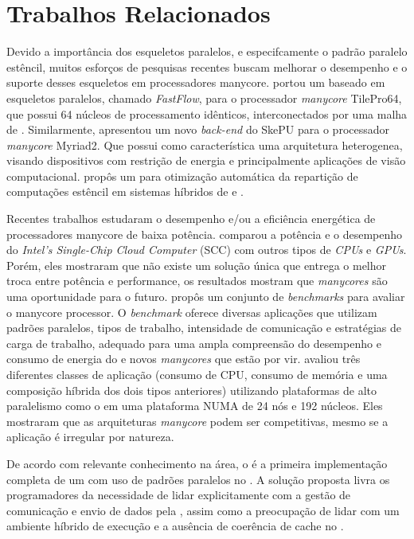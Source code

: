 %
\chapter{Trabalhos Relacionados}

Devido a importância dos esqueletos paralelos, e especifcamente o padrão paralelo estêncil, muitos esforços de pesquisas recentes buscam melhorar o desempenho e o suporte desses esqueletos em processadores manycore. \cite{buono13} portou um \fw baseado em esqueletos paralelos, chamado \textit{FastFlow}, para o processador \textit{manycore} TilePro64, que possui 64 núcleos de processamento idênticos, interconectados por uma malha de \noc. Similarmente, \cite{thoraransen16} apresentou um novo \textit{back-end} do \fw SkePU para o processador \textit{manycore} Myriad2. Que possui como característica uma arquitetura heterogenea, visando dispositivos com restrição de energia e principalmente aplicações de visão computacional. \cite{gysi15} propôs um \fw para otimização automática da repartição de computações estêncil em sistemas híbridos de \cpu e \gpu.

Recentes trabalhos estudaram o desempenho e/ou a eficiência energética de processadores manycore de baixa potência. \cite{SCCEnergy:2012}  comparou a potência e o desempenho do \textit{Intel's Single-Chip Cloud Computer} (SCC) com outros tipos de \textit{CPUs} e \textit{GPUs}. Porém, eles mostraram que não existe um solução única que entrega o melhor troca entre potência e performance, os resultados mostram que \textit{manycores} são uma oportunidade para o futuro. \cite{Castro-Souza-CCPE:2016} propôs um conjunto de \textit{benchmarks} para avaliar o \mppa manycore processor. O \textit{benchmark} oferece diversas aplicações que utilizam padrões paralelos, tipos de trabalho, intensidade de comunicação e estratégias de carga de trabalho, adequado para uma ampla compreensão do desempenho e consumo de energia do \mppa e novos \textit{manycores} que estão por vir. \cite{francesquini:hal-01092325} avaliou três diferentes classes de aplicação (consumo de CPU, consumo de memória e uma composição híbrida dos dois tipos anteriores) utilizando plataformas de alto paralelismo como o \mppa em uma plataforma NUMA de 24 nós e 192 núcleos. Eles mostraram que as arquiteturas \textit{manycore} podem ser competitivas, mesmo se a aplicação é irregular por natureza.

De acordo com relevante conhecimento na área, o \pskelmppa é a primeira implementação completa de um \fw com uso de padrões paralelos no \mppa. A solução proposta livra os programadores da necessidade de lidar explicitamente com a gestão de comunicação e envio de dados pela \noc, assim como a preocupação de lidar com um ambiente híbrido de execução e a ausência de coerência de cache no \mppa.
